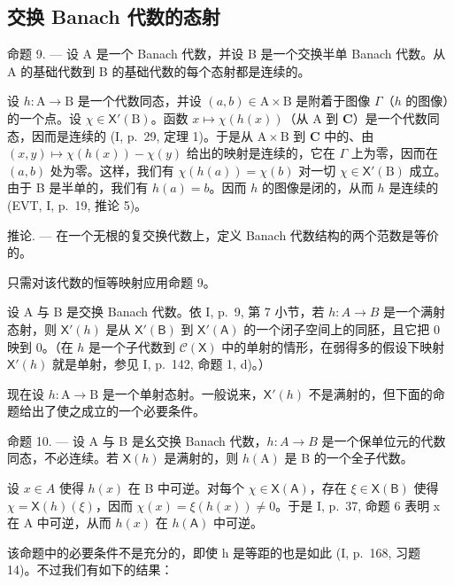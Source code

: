 \subsection{交换 Banach 代数的态射}

命题 9. --- 设 A 是一个 Banach 代数，并设 B 是一个交换半单 Banach 代数。从 A 的基础代数到 B 的基础代数的每个态射都是连续的。

设 \(h \colon \mathrm{A} \to \mathrm{B}\) 是一个代数同态，并设 \((a, b) \in \mathrm{A} \times \mathrm{B}\) 是附着于图像 \(\Gamma\)（\(h\) 的图像）的一个点。设 \(\chi \in \mathsf{X}'(\mathrm{B})\)。函数 \(x \mapsto \chi(h(x))\)（从 \(\mathrm{A}\) 到 \(\mathbf{C}\)）是一个代数同态，因而是连续的 (I, p.~29, 定理 1)。于是从 \(\mathrm{A} \times \mathrm{B}\) 到 \(\mathbf{C}\) 中的、由 \((x, y) \mapsto \chi(h(x)) - \chi(y)\) 给出的映射是连续的，它在 \(\Gamma\) 上为零，因而在 \((a, b)\) 处为零。这样，我们有 \(\chi(h(a)) = \chi(b)\) 对一切 \(\chi \in \mathsf{X}'(\mathrm{B})\) 成立。由于 B 是半单的，我们有 \(h(a) = b\)。因而 \(h\) 的图像是闭的，从而 \(h\) 是连续的 (EVT, I, p.~19, 推论 5)。

推论. --- 在一个无根的复交换代数上，定义 Banach 代数结构的两个范数是等价的。

只需对该代数的恒等映射应用命题 9。

设 A 与 B 是交换 Banach 代数。依 I, p.~9, 第 7 小节，若 \(h\colon A\to B\) 是一个满射态射，则 \(\mathsf{X}'(h)\) 是从 \(\mathsf{X}'(\mathsf{B})\) 到 \(\mathsf{X}'(\mathsf{A})\) 的一个闭子空间上的同胚，且它把 0 映到 0。（在 \(h\) 是一个子代数到 \(\mathcal{C}(\mathsf{X})\) 中的单射的情形，在弱得多的假设下映射 \(\mathsf{X}'(h)\) 就是单射，参见 I, p.~142, 命题 1, d)。）

现在设 \(h \colon \mathrm{A} \to \mathrm{B}\) 是一个单射态射。一般说来，\(\mathsf{X}'(h)\) 不是满射的，但下面的命题给出了使之成立的一个必要条件。

命题 10. --- 设 A 与 B 是幺交换 Banach 代数，\(h\colon A\to B\) 是一个保单位元的代数同态，不必连续。若 \(\mathsf{X}(h)\) 是满射的，则 \(h(\mathrm{A})\) 是 B 的一个全子代数。

设 \(x \in A\) 使得 \(h(x)\) 在 B 中可逆。对每个 \(\chi \in \mathsf{X}(\mathsf{A})\)，存在 \(\xi \in \mathsf{X}(\mathsf{B})\) 使得 \(\chi = \mathsf{X}(h)(\xi)\)，因而 \(\chi(x) = \xi(h(x)) \neq 0\)。于是 I, p.~37, 命题 6 表明 x 在 A 中可逆，从而 \(h(x)\) 在 \(h(\mathsf{A})\) 中可逆。

该命题中的必要条件不是充分的，即使 h 是等距的也是如此 (I, p.~168, 习题 14)。不过我们有如下的结果：

